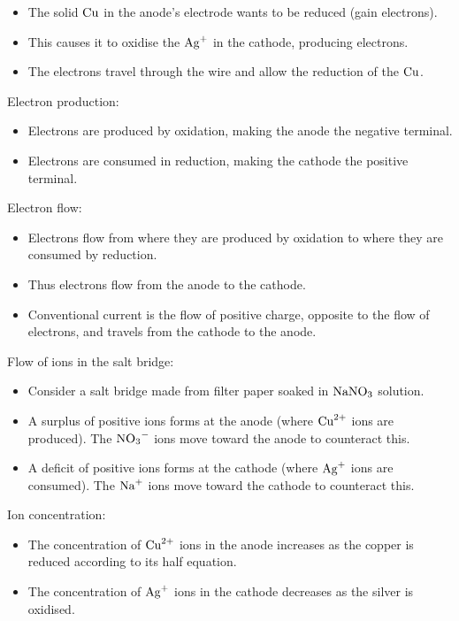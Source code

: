 \documentclass[a4paper,11pt]{article}
\begin{document}
\begin{itemize}
\item The solid $\ce{Cu}$ in the anode's electrode wants to be reduced (gain
	electrons).
\item This causes it to oxidise the $\ce{Ag+}$ in the cathode, producing
	electrons.
\item The electrons travel through the wire and allow the reduction of the
	$\ce{Cu}$.
\end{itemize}

Electron production:

\begin{itemize}
\item Electrons are produced by oxidation, making the anode the negative
	terminal.
\item Electrons are consumed in reduction, making the cathode the positive
	terminal.
\end{itemize}

Electron flow:

\begin{itemize}
\item Electrons flow from where they are produced by oxidation to where they
	are consumed by reduction.
\item Thus electrons flow from the anode to the cathode.
\item Conventional current is the flow of positive charge, opposite to the flow
	of electrons, and travels from the cathode to the anode.
\end{itemize}

Flow of ions in the salt bridge:

\begin{itemize}
\item Consider a salt bridge made from filter paper soaked in $\ce{NaNO3}$
	solution.
\item A surplus of positive ions forms at the anode (where $\ce{Cu^{2+}}$ ions
	are produced). The $\ce{NO3-}$ ions move toward the anode to counteract
	this.
\item A deficit of positive ions forms at the cathode (where $\ce{Ag+}$ ions
	are consumed). The $\ce{Na+}$ ions move toward the cathode to counteract
	this.
\end{itemize}

Ion concentration:

\begin{itemize}
\item The concentration of $\ce{Cu^{2+}}$ ions in the anode increases as the
	copper is reduced according to its half equation.
\item The concentration of $\ce{Ag+}$ ions in the cathode decreases as the
	silver is oxidised.
\end{itemize}
\end{document}
